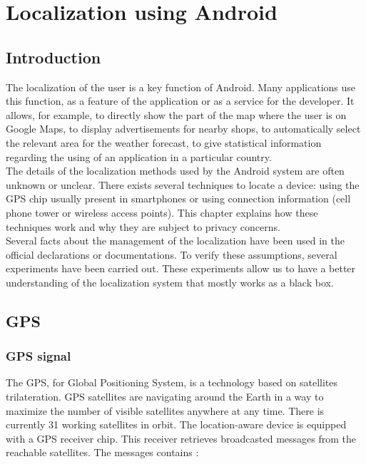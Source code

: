 \chapter{Localization using Android}
\label{chap:and-loc}

\section*{Introduction}
The localization of the user is a key function of Android.
Many applications use this function, as a feature of the application or as a service for the developer.
It allows, for example, to directly show the part of the map where the user is on Google Maps, to display advertisements for nearby shops, to automatically select the relevant area for the weather forecast, to give statistical information regarding the using of an application in a particular country.\\

The details of the localization methods used by the Android system are often unknown or unclear.
There exists several techniques to locate a device: using the GPS chip usually present in smartphones or using connection information (cell phone tower or wireless access points).
This chapter explains how these techniques work and why they are subject to privacy concerns.\\

Several facts about the management of the localization have been used in the official declarations or documentations.
To verify these assumptions, several experiments have been carried out.
These experiments allow us to have a better understanding of the localization system that mostly works as a black box.


\section{GPS}
\label{sec:loc-gps}


\subsection{GPS signal}

The GPS, for Global Positioning System, is a technology based on satellites trilateration\cite{pocketgpsworld}.
GPS satellites are navigating around the Earth in a way to maximize the number of visible satellites anywhere at any time.
There is currently 31 working satellites in orbit.
The location-aware device is equipped with a GPS receiver chip.
This receiver retrieves broadcasted messages from the reachable satellites.
The messages contains :

